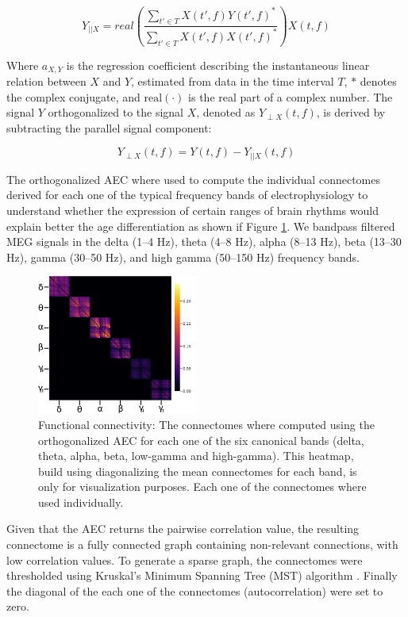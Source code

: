 \documentclass{cys}
\begin{document}
\small
\begin{equation}
Y_{||X} =  real(\frac{\sum_{t'\in T}X(t',f)Y(t',f)^\ast}{\sum_{t'\in T}X(t',f)X(t',f)^\ast}) X(t,f)
\end{equation}

\smallskip
Where $a_{X,Y}$ is the regression coefficient describing the instantaneous linear relation between $X$ and $Y$, estimated from data in the time interval $T$, $\ast$ denotes the complex conjugate, and $\text{real}(\cdot)$ is the real part of a complex number. The signal $Y$ orthogonalized to the signal $X$, denoted as $Y_{\perp X}(t,f)$, is derived by subtracting the parallel signal component:

\begin{equation}
Y_{\perp X}(t,f) = Y(t,f)-Y_{||X}(t,f)
\end{equation}

\smallskip
The orthogonalized AEC where used to compute the individual connectomes derived for each one of the typical frequency bands of electrophysiology to understand whether the expression of certain ranges of brain rhythms would explain better the age differentiation as shown if Figure \ref{FunctionalConnectivity}. We bandpass ﬁltered MEG signals in the delta (1–4 Hz), theta (4–8 Hz), alpha (8–13 Hz), beta (13–30 Hz), gamma (30–50 Hz), and high gamma (50–150 Hz) frequency bands. 

\begin{figure}[H]
\centering
	\includegraphics[width=0.47\textwidth]{FCDK}
	\caption{Functional connectivity: The connectomes where computed using the orthogonalized AEC for each one of the six canonical bands (delta, theta, alpha, beta, low-gamma and high-gamma). This heatmap, build using diagonalizing the mean connectomes for each band, is only for visualization purposes. Each one of the connectomes where used individually.}
	\label{FunctionalConnectivity}
\end{figure}

\bigskip
Given that the AEC returns the pairwise correlation value, the resulting connectome is a fully connected graph containing non-relevant connections, with low correlation values. To generate a sparse graph, the connectomes were thresholded using Kruskal's Minimum Spanning Tree (MST) algorithm \cite{kruskal1956shortest}. Finally the diagonal of the each one of the connectomes (autocorrelation) were set to zero.
\end{document}
